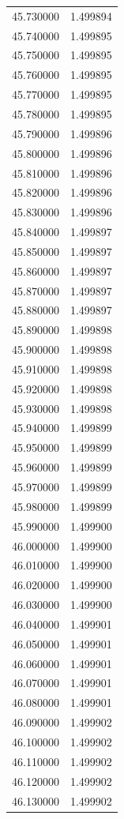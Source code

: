 \begin{tabular}{rr}
45.730000 & 1.499894 \\
45.740000 & 1.499895 \\
45.750000 & 1.499895 \\
45.760000 & 1.499895 \\
45.770000 & 1.499895 \\
45.780000 & 1.499895 \\
45.790000 & 1.499896 \\
45.800000 & 1.499896 \\
45.810000 & 1.499896 \\
45.820000 & 1.499896 \\
45.830000 & 1.499896 \\
45.840000 & 1.499897 \\
45.850000 & 1.499897 \\
45.860000 & 1.499897 \\
45.870000 & 1.499897 \\
45.880000 & 1.499897 \\
45.890000 & 1.499898 \\
45.900000 & 1.499898 \\
45.910000 & 1.499898 \\
45.920000 & 1.499898 \\
45.930000 & 1.499898 \\
45.940000 & 1.499899 \\
45.950000 & 1.499899 \\
45.960000 & 1.499899 \\
45.970000 & 1.499899 \\
45.980000 & 1.499899 \\
45.990000 & 1.499900 \\
46.000000 & 1.499900 \\
46.010000 & 1.499900 \\
46.020000 & 1.499900 \\
46.030000 & 1.499900 \\
46.040000 & 1.499901 \\
46.050000 & 1.499901 \\
46.060000 & 1.499901 \\
46.070000 & 1.499901 \\
46.080000 & 1.499901 \\
46.090000 & 1.499902 \\
46.100000 & 1.499902 \\
46.110000 & 1.499902 \\
46.120000 & 1.499902 \\
46.130000 & 1.499902 \\

\end{tabular}
